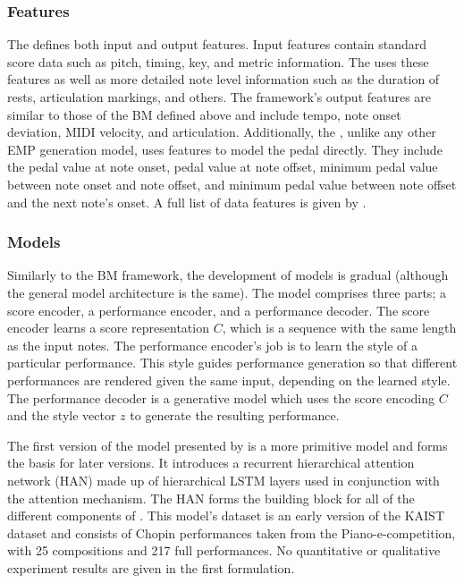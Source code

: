 \subsubsection{Features}
The \vnetf{} defines both input and output features. Input features contain standard score data such as pitch, timing, key, and metric information. The \vnetf{} uses these features as well as more detailed note level information such as the duration of rests, articulation markings, and others. The framework's output features are similar to those of the BM defined above and include tempo, note onset deviation, MIDI velocity, and articulation. Additionally, the \vnetf{}, unlike any other EMP generation model, uses features to model the pedal directly. They include the pedal value at note onset, pedal value at note offset, minimum pedal value between note onset and note offset, and minimum pedal value between note offset and the next note's onset. A full list of data features is given by \citet{jeong2019score}. 

\subsubsection{Models}
Similarly to the BM framework, the development of \vnet{} models is gradual (although the general model architecture is the same). The model comprises three parts; a score encoder, a performance encoder, and a performance decoder. The score encoder learns a score representation $C$, which is a sequence with the same length as the input notes. The performance encoder's job is to learn the style of a particular performance. This style guides performance generation so that different performances are rendered given the same input, depending on the learned style. The performance decoder is a generative model which uses the score encoding $C$ and the style vector $z$ to generate the resulting performance. 

The first version of the model presented by \citet{jeong2018virtuosonet} is a more primitive model and forms the basis for later versions. It introduces a recurrent hierarchical attention network (HAN) made up of hierarchical LSTM layers used in conjunction with the attention mechanism. The HAN forms the building block for all of the different components of \vnet{}. This model's dataset is an early version of the KAIST dataset and consists of Chopin performances taken from the Piano-e-competition, with 25 compositions and 217 full performances. No quantitative or qualitative experiment results are given in the first formulation. 


